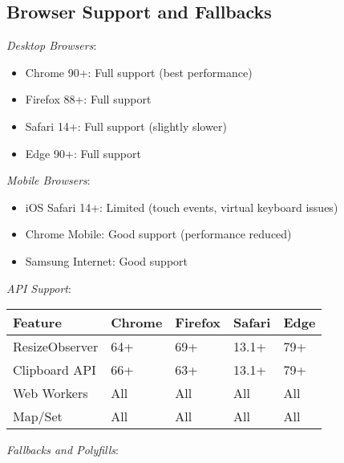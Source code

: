 \documentclass[11pt]{article}
\begin{document}
\subsection{Browser Support and Fallbacks}
\label{sec:org8cc54a7}

\emph{Desktop Browsers}:

\begin{itemize}
\item Chrome 90+: Full support (best performance)
\item Firefox 88+: Full support
\item Safari 14+: Full support (slightly slower)
\item Edge 90+: Full support
\end{itemize}

\emph{Mobile Browsers}:

\begin{itemize}
\item iOS Safari 14+: Limited (touch events, virtual keyboard issues)
\item Chrome Mobile: Good support (performance reduced)
\item Samsung Internet: Good support
\end{itemize}

\emph{API Support}:

\begin{center}
\begin{tabular}{lllll}
Feature & Chrome & Firefox & Safari & Edge\\
\hline
ResizeObserver & 64+ & 69+ & 13.1+ & 79+\\
Clipboard API & 66+ & 63+ & 13.1+ & 79+\\
Web Workers & All & All & All & All\\
Map/Set & All & All & All & All\\
\end{tabular}
\end{center}

\emph{Fallbacks and Polyfills}:
\end{document}
